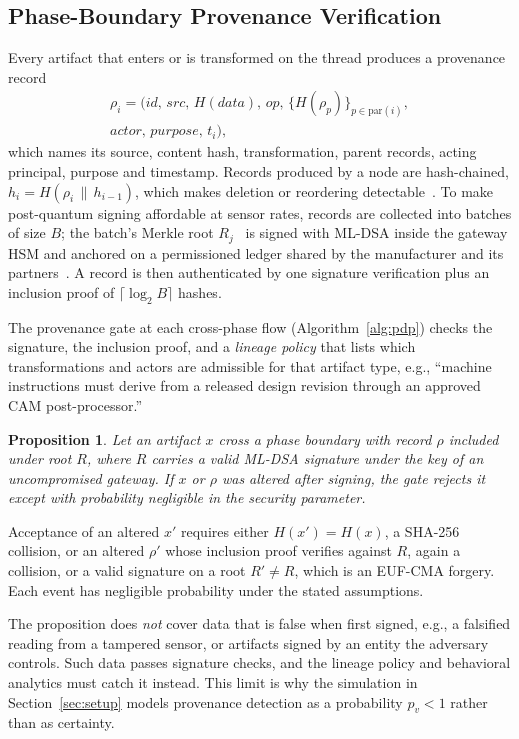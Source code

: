 \documentclass[journal]{IEEEtran}
\newtheorem{proposition}{Proposition}
\begin{document}
\subsection{Phase-Boundary Provenance Verification}
\label{sec:arch-prov}
Every artifact that enters or is transformed on the thread produces a provenance record
\begin{multline}
\rho_i=\bigl(\mathit{id},\,\mathit{src},\,H(\mathit{data}),\,\mathit{op},\,\{H(\rho_p)\}_{p\in\mathrm{par}(i)},\\
\mathit{actor},\,\mathit{purpose},\,t_i\bigr),
\end{multline}
which names its source, content hash, transformation, parent records, acting principal, purpose and timestamp. Records produced by a node are hash-chained, $h_i=H(\rho_i\,\|\,h_{i-1})$, which makes deletion or reordering detectable~\cite{crosby2009log}. To make post-quantum signing affordable at sensor rates, records are collected into batches of size $B$; the batch's Merkle root $R_j$~\cite{merkle1987sig} is signed with ML-DSA inside the gateway HSM and anchored on a permissioned ledger shared by the manufacturer and its partners~\cite{krima2019dth,joannou2020perm}. A record is then authenticated by one signature verification plus an inclusion proof of $\lceil\log_2 B\rceil$ hashes.

The provenance gate at each cross-phase flow (Algorithm~\ref{alg:pdp}) checks the signature, the inclusion proof, and a \emph{lineage policy} that lists which transformations and actors are admissible for that artifact type, e.g., ``machine instructions must derive from a released design revision through an approved CAM post-processor.''

\begin{proposition}
Let an artifact $x$ cross a phase boundary with record $\rho$ included under root $R$, where $R$ carries a valid ML-DSA signature under the key of an uncompromised gateway. If $x$ or $\rho$ was altered after signing, the gate rejects it except with probability negligible in the security parameter.
\end{proposition}
\begin{IEEEproof}
Acceptance of an altered $x'$ requires either $H(x')=H(x)$, a SHA-256 collision, or an altered $\rho'$ whose inclusion proof verifies against $R$, again a collision, or a valid signature on a root $R'\neq R$, which is an EUF-CMA forgery. Each event has negligible probability under the stated assumptions.
\end{IEEEproof}
The proposition does \emph{not} cover data that is false when first signed, e.g., a falsified reading from a tampered sensor, or artifacts signed by an entity the adversary controls. Such data passes signature checks, and the lineage policy and behavioral analytics must catch it instead. This limit is why the simulation in Section~\ref{sec:setup} models provenance detection as a probability $p_v<1$ rather than as certainty.
\end{document}
